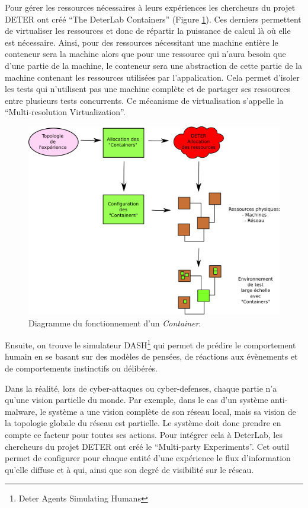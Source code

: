 Pour gérer les ressources nécessaires à leurs expériences les
chercheurs du projet DETER ont créé ``The DeterLab Containers''
(Figure \ref{Conteneur}). Ces derniers permettent de virtualiser les
ressources et donc de répartir la puissance de calcul là où elle est
nécessaire. Ainsi, pour des ressources nécessitant une machine entière
le conteneur sera la machine alors que pour une ressource qui n'aura
besoin que d'une partie de la machine, le conteneur sera une
abstraction de cette partie de la machine contenant les ressources
utilisées par l'appalication. Cela permet d'isoler les tests qui
n'utilisent pas une machine complète et de partager ses ressources
entre plusieurs tests concurrents. Ce mécanisme de virtualisation
s'appelle la ``Multi-resolution Virtualization''.

\begin{figure}
  \centering \includegraphics[scale=0.75]{Pictures/png/Deter_fonctionnement_container_v2}
  \caption{Diagramme du fonctionnement d'un \textit{Container}.}
  \label{Conteneur}
\end{figure}

Ensuite, on trouve le simulateur DASH\footnote{Deter Agents Simulating Humans}
qui permet de prédire le comportement humain en se basant sur des modèles de
pensées, de réactions aux évènements et de comportements instinctifs ou
délibérés.

Dans la réalité, lors de cyber-attaques ou cyber-defenses, chaque
partie n'a qu'une vision partielle du monde. Par exemple, dans le cas
d'un système anti-malware, le système a une vision complète de son
réseau local, mais sa vision de la topologie globale du réseau est
partielle. Le système doit donc prendre en compte ce facteur pour
toutes ses actions. Pour intégrer cela à DeterLab, les chercheurs du
projet DETER ont créé le ``Multi-party Experiments''. Cet outil permet
de configurer pour chaque entité d'une expérience le flux
d'information qu'elle diffuse et à qui, ainsi que son degré de
visibilité sur le réseau.

